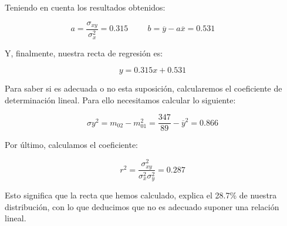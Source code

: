 Teniendo en cuenta los resultados obtenidos:

\begin{equation*}
    a = \dfrac{\sigma_{xy}}{\sigma_x^2} = 0.315
    \hspace{1cm}
    b = \overline{y} - a \overline{x} = 0.531
    \hspace{1cm}
\end{equation*}

Y, finalmente, nuestra recta de regresión es:

\begin{equation*}
    y = 0.315x + 0.531
\end{equation*}

\subproblem
Para saber si es adecuada o no esta suposición, calcularemos el coeficiente de determinación lineal. Para ello necesitamos calcular lo siguiente:

\begin{equation*}
    \sigma{y}^2 = m_{02} - m_{01}^2 = \dfrac{347}{89} - \overline{y}^2 = 0.866
\end{equation*}

Por último, calculamos el coeficiente:

\begin{equation*}
    r^2 = \dfrac{\sigma_{xy}^2}{\sigma_x^2 \sigma_y^2} = 0.287
\end{equation*}

Esto significa que la recta que hemos calculado, explica el 28.7\% de nuestra distribución, con lo que deducimos que no es adecuado suponer una relación lineal.
